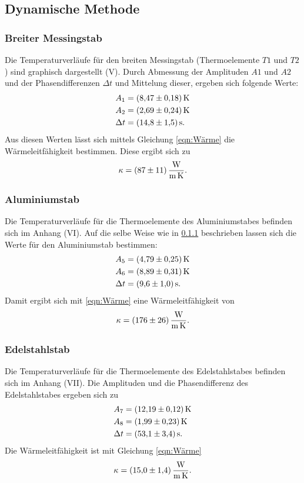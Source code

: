 \subsection{Dynamische Methode}
\subsubsection{Breiter Messingstab}
\label{sec:messing}
Die Temperaturverläufe für den breiten Messingstab (Thermoelemente $T1$ und $T2$)
sind graphisch dargestellt (V).
\newline
Durch Abmessung der Amplituden $A1$ und $A2$ und der Phasendifferenzen $\Delta t$ 
und Mittelung dieser, ergeben sich folgende Werte:
\begin{align*}
    A_{1} &= \SI{8.47 \pm 0.18}{\kelvin} \\
    A_{2} &= \SI{2.69 \pm 0.24}{\kelvin} \\
    \Delta t &= \SI{14.8 \pm 1.5}{\second}.
\end{align*}
Aus diesen Werten lässt sich mittels Gleichung \eqref{eqn:Wärme} die Wärmeleitfähigkeit
bestimmen. Diese ergibt sich zu
\begin{equation*}
    \kappa = \SI{87 \pm 11}{\watt\per\meter\per\kelvin}.
\end{equation*}

\subsubsection{Aluminiumstab}
Die Temperaturverläufe für die Thermoelemente des Aluminiumstabes befinden sich im Anhang (VI).
Auf die selbe Weise wie in \ref{sec:messing} beschrieben lassen sich die Werte
für den Aluminiumstab bestimmen:
\begin{align*}
    A_{5} &= \SI{4.79 \pm 0.25}{\kelvin} \\
    A_{6} &= \SI{8.89 \pm 0.31}{\kelvin} \\
    \Delta t &= \SI{9.6 \pm 1.0}{\second}.
\end{align*}
Damit ergibt sich mit \eqref{eqn:Wärme} eine Wärmeleitfähigkeit von
\begin{equation*}
    \kappa = \SI{176 \pm 26}{\watt\per\meter\per\kelvin}.
\end{equation*}

\subsubsection{Edelstahlstab}
Die Temperaturverläufe für die Thermoelemente des Edelstahlstabes befinden sich im Anhang (VII).
Die Amplituden und die Phasendifferenz des Edelstahlstabes ergeben sich zu
\begin{align*}
    A_{7} &= \SI{12.19 \pm 0.12}{\kelvin} \\
    A_{8} &= \SI{1.99 \pm 0.23}{\kelvin} \\
    \Delta t &= \SI{53.1 \pm 3.4}{\second}.
\end{align*}
Die Wärmeleitfähigkeit ist mit Gleichung \eqref{eqn:Wärme}
\begin{equation*}
    \kappa = \SI{15.0 \pm 1.4}{\watt\per\meter\per\kelvin}.
\end{equation*}